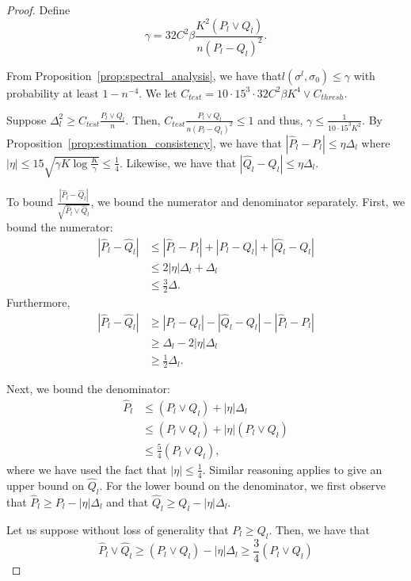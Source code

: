 \begin{proof}
Define 
\[
\gamma =  32 C^2 \beta \frac{K^2 (P_l \vee Q_l)}{n (P_l - Q_l)^2}.
\]

From Proposition~\ref{prop:spectral_analysis}, we have that$ l(\sigma^l, \sigma_0) \leq \gamma$ with probability at least $1 - n^{-4}$.  We let $C_{test} = 10 \cdot 15^3 \cdot 32 C^2 \beta K^4 \vee C_{thresh}$. 

Suppose $\Delta_l^2 \geq  C_{test} \frac{P_l \vee Q_l}{n} $. Then, $C_{test} \frac{P_l \vee Q_l}{n (P_l - Q_l)^2} \leq 1$ and thus, $\gamma \leq \frac{1}{10 \cdot 15^3 K^2}$. By Proposition~\ref{prop:estimation_consistency}, we have that $|\hat{P}_l - P_l| \leq \eta \Delta_l$ where $|\eta| \leq 15 \sqrt{\gamma K \log \frac{K}{\gamma}} \leq \frac{1}{4}$. Likewise, we have that $| \hat{Q}_l - Q_l | \leq \eta \Delta_l$. 

To bound $\frac{ | \hat{P}_l - \hat{Q}_l | }{\sqrt{ \hat{P}_l \vee \hat{Q}_l}}$, we bound the numerator and denominator separately. First, we bound the numerator:
\begin{align*}
| \hat{P}_l - \hat{Q}_l | &\leq |\hat{P}_l - P_l| + |P_l - Q_l| + |\hat{Q}_l - Q_l|   \\
   &\leq 2 |\eta| \Delta_l + \Delta_l \\
   &\leq \frac{3}{2} \Delta.
\end{align*}
Furthermore,
\begin{align*}
| \hat{P}_l - \hat{Q}_l | &\geq  |P_l - Q_l| - |\hat{Q}_l - Q_l| - |\hat{P}_l - P_l|   \\
   &\geq  \Delta_l - 2 |\eta| \Delta_l \\
  &\geq \frac{1}{2} \Delta_l.
\end{align*}

Next, we bound the denominator:
\begin{align*}
\hat{P}_l &\leq (P_l \vee Q_l) + |\eta| \Delta_l\\
   &\leq (P_l \vee Q_l) + |\eta| (P_l \vee Q_l) \\
   &\leq \frac{5}{4} (P_l \vee Q_l),
\end{align*}
where we have used the fact that $|\eta| \leq \frac{1}{4}$. Similar reasoning applies to give an upper bound on $\hat{Q}_l$. For the lower bound on the denominator, we first observe that $\hat{P}_l \geq P_l - |\eta| \Delta_l $ and that 
$\hat{Q}_l \geq Q_l - |\eta| \Delta_l$.

Let us suppose without loss of generality that $P_l \geq Q_l$. Then, we have that 
\[
\hat{P}_l \vee \hat{Q}_l \geq (P_l \vee Q_l) - |\eta| \Delta_l \geq \frac{3}{4} (P_l \vee Q_l)
\]



\end{proof}
